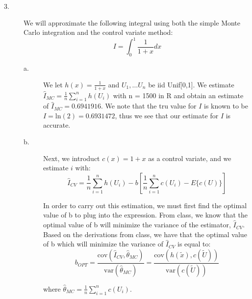 \documentclass[12pt]{article}
\begin{document}
\begin{description}
\item[3.] We will approximate the following integral using both the simple Monte Carlo integration and the control variate method:
\[I = \int_0^1 \frac{1}{1 + x} dx\]

\begin{description}
\item[a.]We let $h(x) = \frac{1}{1+x}$ and $U_1, \dots U_n$ be iid Unif[0,1]. We estimate $\hat{I}_{MC} = \frac{1}{n} \sum_{i = 1}^n h(U_i)$ with n = 1500 in R and obtain an estimate of $\hat{I}_{MC} = 0.6941916$. We note that the tru value for $I$ is known to be $I = \mathrm{ln}(2) = 0.6931472$, thus we see that our estimate for $I$ is accurate. 
\item[b.] Next, we introduct $c(x) = 1 + x$ as a control variate, and we estimate $i$ with:
\[\hat{I}_{CV} = \frac{1}{n} \sum_{i = 1}^n h(U_i) - b \left[ \frac{1}{n} \sum_{i = 1}^n c(U_i) - E\{c(U)\} \right]\]

In order to carry out this estimation, we must first find the optimal value of b to plug into the expression. From class, we know that the optimal value of b will minimize the variance of the estimator, $\hat{I}_{CV}$. Based on the derivations from class, we have that the optimal value of b which will minimize the variance of  $\hat{I}_{CV}$ is equal to:
\[b_{OPT} = \frac{\mathrm{cov}(\hat{I}_{CV}, \hat{\theta}_{MC})}{\mathrm{var}(\hat{\theta}_{MC})} = \frac{\mathrm{cov}(h(\tilde{x}), c(\tilde{U}))}{\mathrm{var}(c(\tilde{U}))} \]

where $\hat{\theta}_{MC} = \frac{1}{n} \sum_{i = 1}^n c(U_i)$.\\


\end{description}
\end{description}
\end{document}
